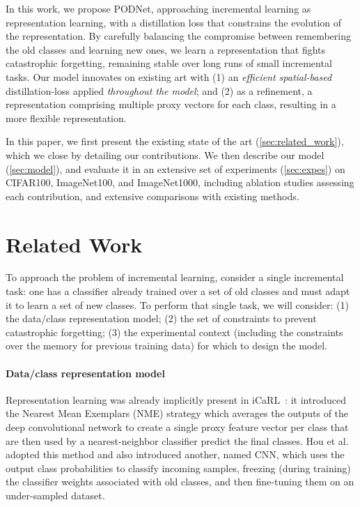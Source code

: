 In this work, we propose PODNet, approaching incremental learning as representation learning, with a
distillation loss that constrains the evolution of the representation. By carefully balancing the
compromise between remembering the old classes and learning new ones, we learn a representation that
fights catastrophic forgetting, remaining stable over long runs of small incremental tasks. Our
model innovates on existing art with (1) an \textit{efficient spatial-based} distillation-loss
applied \textit{throughout the model}; and (2) as a refinement, a representation comprising multiple
proxy vectors for each class, resulting in a more flexible representation.

In this paper, we first present the existing state of the art (\autoref{sec:related_work}), which we
close by detailing our contributions. We then describe our model (\autoref{sec:model}), and evaluate
it in an extensive set of experiments (\autoref{sec:expes}) on CIFAR100, ImageNet100, and
ImageNet1000, including ablation studies assessing each contribution, and extensive comparisons with
existing methods.

\section{Related Work}
\label{sec:related_work}

To approach the problem of incremental learning, consider a single incremental task: one has a
classifier already trained over a set of old classes and must adapt it to learn a set of new
classes. To perform that single task, we will consider: (1) the data/class representation model; (2)
the set of constraints to prevent catastrophic forgetting; (3) the experimental context (including
the constraints over the memory for previous training data) for which to design the model.

\paragraph{Data/class representation model} Representation learning was already implicitly present
in iCaRL~\citep{rebuffi2017icarl}: it introduced the Nearest Mean Exemplars (NME) strategy which
averages the outputs of the deep convolutional network to create a single proxy feature vector per
class that are then used by a nearest-neighbor classifier predict the final classes. Hou et
al.~\citep{hou2019ucir} adopted this method and also introduced another, named CNN, which uses the
output class probabilities to classify incoming samples, freezing (during training) the classifier
weights associated with old classes, and then fine-tuning them on an under-sampled dataset.


